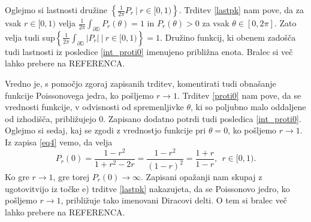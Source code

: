 \documentclass[mat1, tisk]{fmfdelo}
\begin{document}
%
%

    Oglejmo si lastnosti družine $\left\{ \frac{1}{2 \pi} P_r~|~r \in [0,1)\right\}$. Trditev \ref{lastpk} nam pove, da za vsak $r \in [0,1)$ velja $\frac{1}{2\pi}\int_{\partial \mathbb{D}}{P_r(\theta)} = 1$ in $P_r(\theta) > 0$ za vsak $\theta \in [0, 2 \pi]$.
    Zato velja tudi sup$\left\{\frac{1}{2 \pi}\int_{\partial \mathbb{D}}{\left| P_{r}\right|}~|~r \in [0,1)\right\}= 1$. Družino funkcij, ki obenem zadošča tudi lastnosti iz posledice \ref{int_proti0} imenujeno približna enota. 
    Bralec si več lahko prebere na REFERENCA.
 
    Vredno je, s pomočjo zgoraj zapisanih trditev, komentirati tudi obnašanje funkcije Poissonovega jedra, ko pošljemo $r \to 1$. Trditev \ref{proti0} nam pove, da se vrednosti funkcije, v odvisnosti od spremenljivke $\theta$, ki so poljubno malo oddaljene od izhodišča, približujejo $0$. 
    Zapisano dodatno potrdi tudi posledica \ref{int_proti0}.
    Oglejmo si sedaj, kaj se zgodi z vrednostjo funkcije pri $\theta = 0$, ko pošljemo $r \to 1$. Iz zapisa \eqref{eq4} vemo, da velja
    $$
    P_r(0) = \frac{1-r^2}{1+ r^2 - 2r} = \frac{1- r^2}{(1 - r)^2} = \frac{1 + r}{1 -r},~~r \in [0,1).
    $$
    Ko gre $r \to 1$, gre torej $P_r(0) \to \infty$. Zapisani opažanji nam skupaj z ugotovitvijo iz točke e) trditve \ref{lastpk} nakazujeta, da se Poissonovo jedro, ko pošljemo $r \to 1$, približuje tako imenovani Diracovi delti. 
    O tem si bralec več lahko prebere na REFERENCA.
\end{document}
